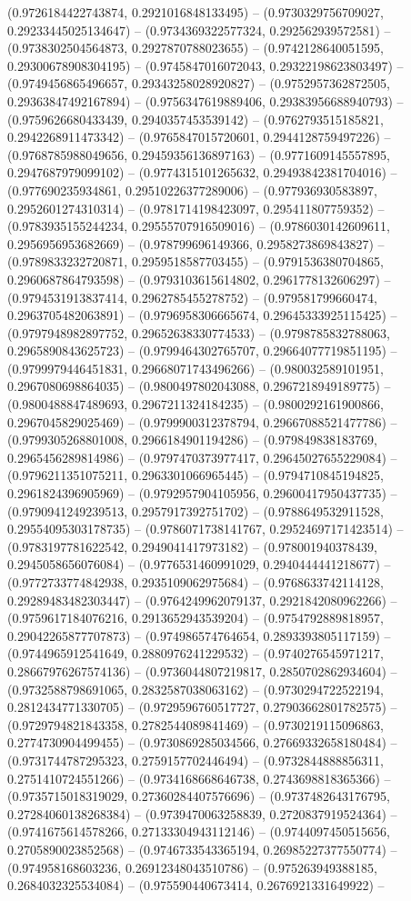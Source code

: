 (0.9726184422743874, 0.2921016848133495) -- (0.9730329756709027, 0.29233445025134647) -- (0.9734369322577324, 0.292562939572581) -- (0.9738302504564873, 0.2927870788023655) -- (0.9742128640051595, 0.29300678908304195) -- (0.9745847016072043, 0.29322198623803497) -- (0.9749456865496657, 0.29343258028920827) -- (0.9752957362872505, 0.29363847492167894) -- (0.9756347619889406, 0.29383956688940793) -- (0.9759626680433439, 0.2940357453539142) -- (0.9762793515185821, 0.2942268911473342) -- (0.9765847015720601, 0.2944128759497226) -- (0.9768785988049656, 0.29459356136897163) -- (0.9771609145557895, 0.2947687979099102) -- (0.9774315101265632, 0.29493842381704016) -- (0.977690235934861, 0.29510226377289006) -- (0.977936930583897, 0.2952601274310314) -- (0.9781714198423097, 0.295411807759352) -- (0.9783935155244234, 0.29555707916509016) -- (0.9786030142609611, 0.2956956953682669) -- (0.978799696149366, 0.2958273869843827) -- (0.9789833232720871, 0.2959518587703455) -- (0.9791536380704865, 0.2960687864793598) -- (0.9793103615614802, 0.2961778132606297) -- (0.9794531913837414, 0.2962785455278752) -- (0.979581799660474, 0.2963705482063891) -- (0.9796958306665674, 0.29645333925115425) -- (0.9797948982897752, 0.29652638330774533) -- (0.9798785832788063, 0.2965890843625723) -- (0.9799464302765707, 0.29664077719851195) -- (0.9799979446451831, 0.29668071743496266) -- (0.980032589101951, 0.2967080698864035) -- (0.9800497802043088, 0.2967218949189775) -- (0.9800488847489693, 0.2967211324184235) -- (0.9800292161900866, 0.2967045829025469) -- (0.9799900312378794, 0.29667088521477786) -- (0.9799305268801008, 0.2966184901194286) -- (0.979849838183769, 0.2965456289814986) -- (0.9797470373977417, 0.29645027655229084) -- (0.9796211351075211, 0.2963301066965445) -- (0.9794710845194825, 0.2961824396905969) -- (0.9792957904105956, 0.29600417950437735) -- (0.9790941249239513, 0.2957917392751702) -- (0.9788649532911528, 0.29554095303178735) -- (0.9786071738141767, 0.29524697171423514) -- (0.9783197781622542, 0.2949041417973182) -- (0.978001940378439, 0.2945058656076084) -- (0.9776531460991029, 0.2940444441218677) -- (0.9772733774842938, 0.2935109062975684) -- (0.9768633742114128, 0.29289483482303447) -- (0.9764249962079137, 0.2921842080962266) -- (0.9759617184076216, 0.2913652943539204) -- (0.9754792889818957, 0.29042265877707873) -- (0.974986574764654, 0.2893393805117159) -- (0.9744965912541649, 0.2880976241229532) -- (0.9740276545971217, 0.28667976267574136) -- (0.9736044807219817, 0.2850702862934604) -- (0.9732588798691065, 0.2832587038063162) -- (0.9730294722522194, 0.2812434771330705) -- (0.9729596760517727, 0.27903662801782575) -- (0.9729794821843358, 0.2782544089841469) -- (0.9730219115096863, 0.2774730904499455) -- (0.9730869285034566, 0.27669332658180484) -- (0.9731744787295323, 0.2759157702446494) -- (0.9732844888856311, 0.2751410724551266) -- (0.9734168668646738, 0.2743698818365366) -- (0.9735715018319029, 0.27360284407576696) -- (0.9737482643176795, 0.27284060138268384) -- (0.9739470063258839, 0.2720837919524364) -- (0.9741675614578266, 0.27133304943112146) -- (0.9744097450515656, 0.2705890023852568) -- (0.9746733543365194, 0.26985227377550774) -- (0.974958168603236, 0.26912348043510786) -- (0.975263949388185, 0.2684032325534084) -- (0.975590440673414, 0.2676921331649922) -- 